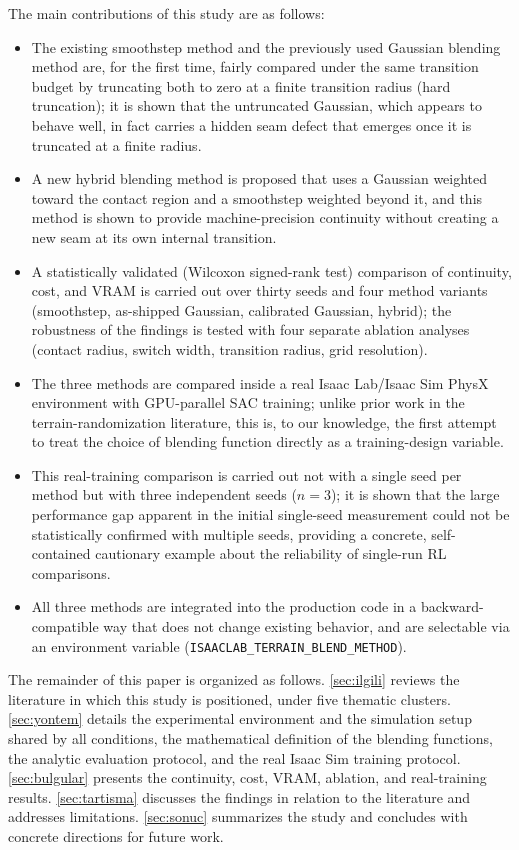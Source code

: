 The main contributions of this study are as follows:

\begin{itemize}
\item The existing smoothstep method and the previously used Gaussian
blending method are, for the first time, fairly compared under the same
transition budget by truncating both to zero at a finite transition
radius (hard truncation); it is shown that the untruncated Gaussian,
which appears to behave well, in fact carries a hidden seam defect that
emerges once it is truncated at a finite radius.
\item A new hybrid blending method is proposed that uses a Gaussian
weighted toward the contact region and a smoothstep weighted beyond it,
and this method is shown to provide machine-precision continuity without
creating a new seam at its own internal transition.
\item A statistically validated (Wilcoxon signed-rank test) comparison of
continuity, cost, and VRAM is carried out over thirty seeds and four
method variants (smoothstep, as-shipped Gaussian, calibrated Gaussian,
hybrid); the robustness of the findings is tested with four separate
ablation analyses (contact radius, switch width, transition radius, grid
resolution).
\item The three methods are compared inside a real Isaac Lab/Isaac Sim
PhysX environment with GPU-parallel SAC training; unlike prior work in
the terrain-randomization literature, this is, to our knowledge, the
first attempt to treat the choice of blending function directly as a
training-design variable.
\item This real-training comparison is carried out not with a single
seed per method but with three independent seeds ($n=3$); it is shown
that the large performance gap apparent in the initial single-seed
measurement could not be statistically confirmed with multiple seeds,
providing a concrete, self-contained cautionary example about the
reliability of single-run RL comparisons.
\item All three methods are integrated into the production code in a
backward-compatible way that does not change existing behavior, and are
selectable via an environment variable
(\texttt{ISAACLAB\_TERRAIN\_BLEND\_METHOD}).
\end{itemize}

The remainder of this paper is organized as follows. \cref{sec:ilgili}
reviews the literature in which this study is positioned, under five
thematic clusters. \cref{sec:yontem} details the experimental
environment and the simulation setup shared by all conditions, the
mathematical definition of the blending functions, the analytic
evaluation protocol, and the real Isaac Sim training protocol.
\cref{sec:bulgular} presents the continuity, cost, VRAM, ablation, and
real-training results. \cref{sec:tartisma} discusses the findings in
relation to the literature and addresses limitations.
\cref{sec:sonuc} summarizes the study and concludes with concrete
directions for future work.
